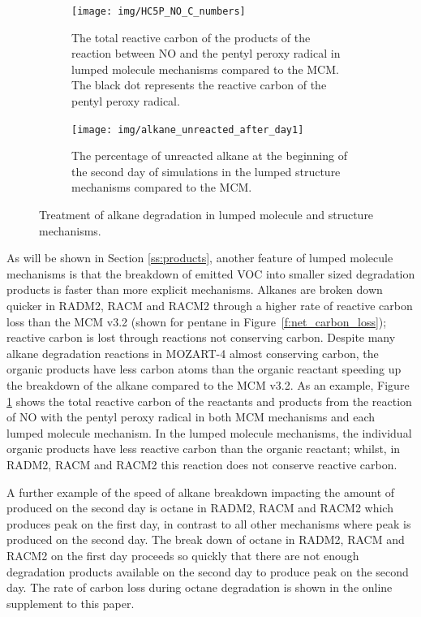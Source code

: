 %
\begin{figure}
    \centering
    \begin{subfigure}[t]{0.4\textwidth}
        \texttt{[image: img/HC5P\_NO\_C\_numbers]}
        \caption{The total reactive carbon of the products of the reaction between NO and the pentyl peroxy radical in lumped molecule mechanisms compared to the MCM. The black dot represents the reactive carbon of the pentyl peroxy radical.}
        \label{f:HC5P_NO}
    \end{subfigure}
    \hspace{1cm}
    \begin{subfigure}[t]{0.4\textwidth}
        \texttt{[image: img/alkane\_unreacted\_after\_day1]}
        \caption{The percentage of unreacted alkane at the beginning of the second day of simulations in the lumped structure mechanisms compared to the MCM.}
        \label{f:Unreacted_PAR}
    \end{subfigure}
    \vspace{3mm}
    \caption{Treatment of alkane degradation in lumped molecule and structure mechanisms.}
    \vspace{-4mm}
    \label{f:alkanes}
\end{figure}
%
As will be shown in Section \ref{ss:products}, another feature of lumped molecule mechanisms is that the breakdown of emitted VOC into smaller sized degradation products is faster than more explicit mechanisms.
Alkanes are broken down quicker in RADM2, RACM and RACM2 through a higher rate of reactive carbon loss than the MCM v3.2 (shown for pentane in \mbox{Figure \ref{f:net_carbon_loss}}); reactive carbon is lost through reactions not conserving carbon.
Despite many alkane degradation reactions in MOZART-4 almost conserving carbon, the organic products have less carbon atoms than the organic reactant speeding up the breakdown of the alkane compared to the MCM v3.2.
As an example, Figure \ref{f:HC5P_NO} shows the total reactive carbon of the reactants and products from the reaction of NO with the pentyl peroxy radical in both MCM mechanisms and each lumped molecule mechanism.
In the lumped molecule mechanisms, the individual organic products have less reactive carbon than the organic reactant; whilst, in RADM2, RACM and RACM2 this reaction does not conserve reactive carbon.  

A further example of the speed of alkane breakdown impacting the amount of  produced on the second day is octane in RADM2, RACM and RACM2 which produces peak  on the first day, in contrast to all other mechanisms where peak  is produced on the second day.
The break down of octane in RADM2, RACM and RACM2 on the first day proceeds so quickly that there are not enough degradation products available on the second day to produce peak  on the second day.
The rate of carbon loss during octane degradation is shown in the online supplement to this paper.

